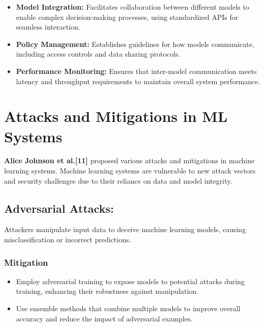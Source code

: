 \documentclass[oneside,a4paper,12pt]{report}
\begin{document}
\begin{itemize}
    \item \textbf{Model Integration:} Facilitates collaboration between different models to enable complex decision-making processes, using standardized APIs for seamless interaction.
    \item \textbf{Policy Management:} Establishes guidelines for how models communicate, including access controls and data sharing protocols.
    \item \textbf{Performance Monitoring:} Ensures that inter-model communication meets latency and throughput requirements to maintain overall system performance.
\end{itemize}

\vspace*{2\baselineskip}

\section{Attacks and Mitigations in ML Systems}
\vspace*{1\baselineskip}
\textbf{Alice Johnson et al.[11]} proposed various attacks and mitigations in machine learning systems.  
\vspace*{1\baselineskip}
\newline Machine learning systems are vulnerable to new attack vectors and security challenges due to their reliance on data and model integrity.

\subsection{Adversarial Attacks:} Attackers manipulate input data to deceive machine learning models, causing misclassification or incorrect predictions.
\subsubsection{Mitigation}
\begin{itemize}
    \item Employ adversarial training to expose models to potential attacks during training, enhancing their robustness against manipulation.
    \item Use ensemble methods that combine multiple models to improve overall accuracy and reduce the impact of adversarial examples.
\end{itemize}

\vspace*{1\baselineskip}
\end{document}
